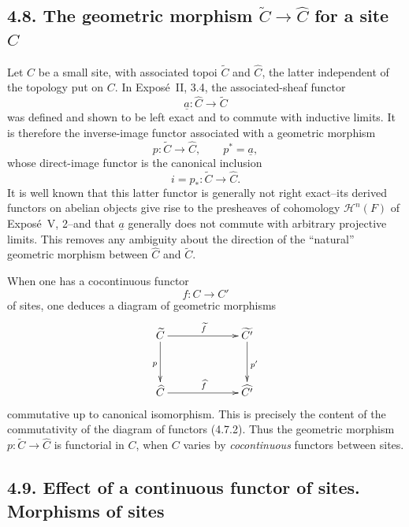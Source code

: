 \documentclass[11pt]{article}
\begin{document}
\subsection*{4.8. The geometric morphism \(\widetilde C\to\widehat C\) for a site \(C\)}
Let \(C\) be a small site, with associated topoi \(\widetilde C\) and \(\widehat C\), the latter independent of the topology put on \(C\). In Expos\'e~II, 3.4, the associated-sheaf functor
\[
\underline a:\widehat C\longrightarrow\widetilde C
\]
was defined and shown to be left exact and to commute with inductive limits. It is therefore the inverse-image functor associated with a geometric morphism
\[
p:\widetilde C\longrightarrow\widehat C,
\qquad p^\ast=\underline a,
\]
whose direct-image functor is the canonical inclusion
\[
i=p_\ast:\widetilde C\longrightarrow\widehat C.
\]
It is well known that this latter functor is generally not right exact--its derived functors on abelian objects give rise to the presheaves of cohomology \(\mathcal H^n(F)\) of Expos\'e~V, 2--and that \(\underline a\) generally does not commute with arbitrary projective limits. This removes any ambiguity about the direction of the ``natural'' geometric morphism between \(\widehat C\) and \(\widetilde C\).

When one has a cocontinuous functor
\[
f:C\longrightarrow C'
\]
of sites, one deduces a diagram of geometric morphisms
\[
\xymatrix@C=2.25cm@R=1.25cm{
\widetilde C \ar[d]_p \ar[r]^{\widetilde f} &
\widetilde{C'} \ar[d]^{p'}\\
\widehat C \ar[r]^{\widehat f} & \widehat{C'}
}
\]
commutative up to canonical isomorphism. This is precisely the content of the commutativity of the diagram of functors (4.7.2). Thus the geometric morphism \(p:\widetilde C\to\widehat C\) is functorial in \(C\), when \(C\) varies by \emph{cocontinuous} functors between sites.

\subsection*{4.9. Effect of a continuous functor of sites. Morphisms of sites}
\end{document}
